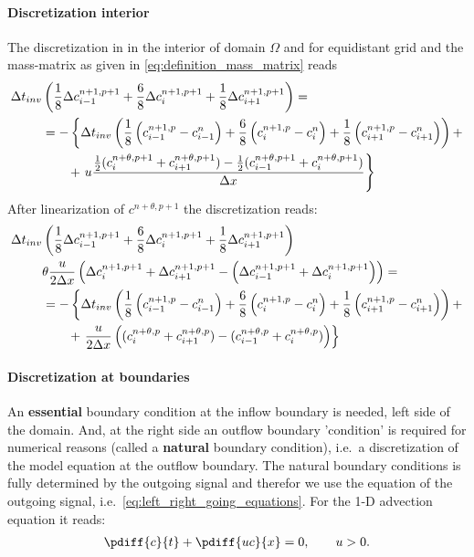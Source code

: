 \paragraph*{Discretization interior}
The discretization in \deltaformulation in the interior of domain $\Omega$ and
for equidistant grid and the mass-matrix as given in \autoref{eq:definition_mass_matrix} reads
\begin{align}
    \Delta t_{inv} & \left(\frac{1}{8} \Delta c^{n+1,p+1}_{i-1} + \frac{6}{8} \Delta c^{n+1,p+1}_{i} + \frac{1}{8} \Delta c^{n+1,p+1}_{i+1}\right)  =
    \nonumber \\*
    & = -\left\{ \Delta t_{inv} \left( \frac{1}{8}\left( c^{n+1,p}_{i-1} - c^{n}_{i-1} \right) + \frac{6}{8}\left( c^{n+1,p}_{i} - c^{n}_{i} \right) + \frac{1}{8}\left( c^{n+1,p}_{i+1} - c^{n}_{i+1} \right)\right) + \right.
    \nonumber \\*
    & \qquad + \left. u \frac{\frac{1}{2}(c^{n+\theta, p+1}_{i} + c^{n+\theta,p+1}_{i+1}) -  \frac{1}{2} (c^{n+\theta, p+1}_{i-1} +c^{n+\theta,p+1}_{i})}{\Delta x} \right\}
\end{align}
After linearization of $c^{n+\theta,p+1}$ the discretization reads:
\begin{align}
    \Delta t_{inv} & \left(\frac{1}{8} \Delta c^{n+1,p+1}_{i-1} + \frac{6}{8} \Delta c^{n+1,p+1}_{i} + \frac{1}{8} \Delta c^{n+1,p+1}_{i+1}\right)
    \nonumber \\*
    & \theta \frac{u}{2\Delta x}\left(  \Delta c^{n+1,p+1}_{i} + \Delta c^{n+1,p+1}_{i+1} - \left( \Delta c^{n+1,p+1}_{i-1} + \Delta c^{n+1,p+1}_{i}  \right)\right)=
    \nonumber \\*
    & = -\left\{ \Delta t_{inv} \left( \frac{1}{8}\left( c^{n+1,p}_{i-1} - c^{n}_{i-1} \right) + \frac{6}{8}\left( c^{n+1,p}_{i} - c^{n}_{i} \right) + \frac{1}{8}\left( c^{n+1,p}_{i+1} - c^{n}_{i+1} \right)\right) + \right.
    \nonumber \\*
    & \qquad + \left. \frac{u}{2\Delta x} \left((c^{n+\theta, p}_{i} + c^{n+\theta,p}_{i+1}) -  (c^{n+\theta, p}_{i-1} +c^{n+\theta,p}_{i}) \right) \right\}
\end{align}


\paragraph*{Discretization at boundaries}
An \textbf{essential} boundary condition at the inflow boundary is needed, left side of the domain.
And, at the right side an outflow boundary 'condition' is required for numerical reasons (called  a \textbf{natural} boundary condition), i.e.\ a discretization of the model equation at the outflow boundary.
The natural boundary conditions is fully determined by the outgoing signal and therefor we use the equation of the outgoing signal, i.e.\ \autoref{eq:left_right_going_equations}.
For the 1-D advection equation it reads:
\begin{align}
    \pdiff{c}{t} + \pdiff{uc}{x} = 0, \qquad u>0. \label{eq:1d_adv_nat_boundary}
\end{align}


